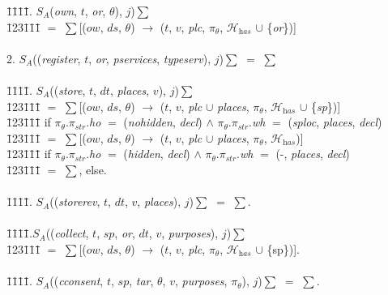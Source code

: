 \documentclass[a4paper]{article}
\begin{document}
\begin{tabbing}  
    \=1\=1\=1\=1\= . $S_A$(\textit{own}, $t$, \textit{or}, $\theta$), $j$)$\sum$\\
    \=123\=1\=1\=1\= \kill
		\>\> $=$ $\sum$[($ow$, $ds$, $\theta$) $\rightarrow$ ($t$, $v$, \textit{plc}, $\pi_{\theta}$, $\mathcal{H}_{\textit{has}}$ $\cup$ \{\textit{or}\})]\\\\ 
2. $S_A$((\textit{register}, $t$, \textit{or}, \textit{pservices}, \textit{typeserv}), $j$)$\sum$ $=$ $\sum$\\\\
\=1\=1\=1\=1\= . $S_A$((\textit{store}, $t$, $dt$, \textit{places}, $v$), $j$)$\sum$\\ 
		\=123\=1\=1\=1\= \kill
		\>\> $=$ $\sum$[($ow$, $ds$, $\theta$) $\rightarrow$ ($t$, $v$,  \textit{plc} $\cup$ \textit{places}, $\pi_{\theta}$, $\mathcal{H}_{\textit{has}}$ $\cup$ \{\textit{sp}\})]\\
		\=123\=1\=1\=1\= \kill
		\>\>\>\> if $\pi_{\theta}$.$\pi_{str}$.\textit{ho} $=$ (\textit{nohidden}, \textit{decl}) $\wedge$ $\pi_{\theta}$.$\pi_{str}$.\textit{wh} $=$ (\textit{sploc}, \textit{places}, \textit{decl})\\
		\=123\=1\=1\=1\= \kill	 
		\>\> $=$ $\sum$[($ow$, $ds$, $\theta$) $\rightarrow$ ($t$, $v$,  \textit{plc} $\cup$ \textit{places}, $\pi_{\theta}$, $\mathcal{H}_{\textit{has}}$)]\\
		\=123\=1\=1\=1\= \kill
		\>\>\>\> if $\pi_{\theta}$.$\pi_{str}$.\textit{ho} $=$ (\textit{hidden}, \textit{decl}) $\wedge$ $\pi_{\theta}$.$\pi_{str}$.\textit{wh} $=$ (-, \textit{places}, \textit{decl})\\
		\=123\=1\=1\=1\= \kill	 
		\>\> $=$ $\sum$, else.\\\\
\=1\=1\=1\=1\= .	$S_A$((\textit{storerev}, $t$, $dt$, $v$, \textit{places}), $j$)$\sum$ $=$ $\sum$.\\\\			 
\=1\=1\=1\=1\= .$S_A$((\textit{collect}, $t$, $sp$, \textit{or}, $dt$, $v$,  \textit{purposes}), $j$)$\sum$\\ 
		\=123\=1\=1\=1\= \kill
		\>\> $=$ $\sum$[($ow$, $ds$, $\theta$) $\rightarrow$ ($t$, $v$,  \textit{plc}, $\pi_{\theta}$, $\mathcal{H}_{\textit{has}}$ $\cup$ \{sp\})].\\\\		
\=1\=1\=1\=1\= .	$S_A$((\textit{cconsent}, $t$,  $sp$, \textit{tar}, $\theta$, $v$, \textit{purposes}, $\pi_{\theta}$), $j$)$\sum$ $=$ $\sum$.\\\\

\end{tabbing}
\end{document}
